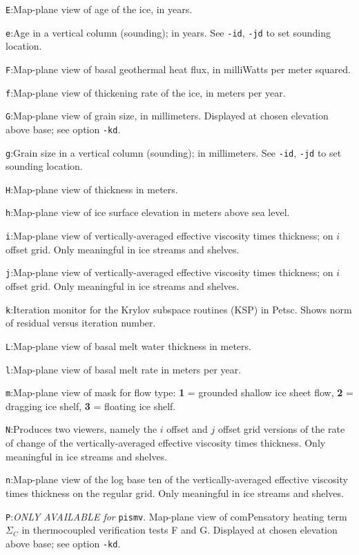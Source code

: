 \documentclass[11pt,final]{amsart}
\renewcommand{\t}[1]{\texttt{#1}}
\begin{document}
\verb|E|:\quad Map-plane view of age of the ice, in years.

\verb|e|:\quad Age in a vertical column (sounding); in years.  See \verb|-id|, \verb|-jd| to set sounding location.

\verb|F|:\quad Map-plane view of basal geothermal heat flux, in milliWatts per meter squared.

\verb|f|:\quad Map-plane view of thickening rate of the ice, in meters per year.

\verb|G|:\quad Map-plane view of grain size, in millimeters.  Displayed at chosen elevation above base; see option \verb|-kd|.

\verb|g|:\quad Grain size in a vertical column (sounding); in millimeters.  See \verb|-id|, \verb|-jd| to set sounding location.

\verb|H|:\quad Map-plane view of thickness in meters.

\verb|h|:\quad Map-plane view of ice surface elevation in meters above sea level.

\verb|i|:\quad Map-plane view of vertically-averaged effective viscosity times thickness; on $i$ offset grid.  Only meaningful in ice streams and shelves.

\verb|j|:\quad Map-plane view of vertically-averaged effective viscosity times thickness; on $i$ offset grid.  Only meaningful in ice streams and shelves.

\verb|k|:\quad Iteration monitor for the Krylov subspace routines (KSP) in Petsc.  Shows norm of residual versus iteration number.

\verb|L|:\quad Map-plane view of basal melt water thickness in meters.

\verb|l|:\quad Map-plane view of basal melt rate in meters per year.

\verb|m|:\quad Map-plane view of mask for flow type:  \textbf{1} = grounded shallow ice sheet flow,  \textbf{2} = dragging ice shelf, \textbf{3} = floating ice shelf.

\verb|N|:\quad Produces two viewers, namely the $i$ offset and $j$ offset grid versions of the rate of change of the vertically-averaged effective viscosity times thickness.  Only meaningful in ice streams and shelves.

\verb|n|:\quad Map-plane view of the log base ten of the vertically-averaged effective viscosity times thickness on the regular grid.  Only meaningful in ice streams and shelves.

\verb|P|:\quad \emph{ONLY AVAILABLE for }\t{pismv}.  Map-plane view of comPensatory heating term $\Sigma_C$ in thermocoupled verification tests F and G.  Displayed at chosen elevation above base; see option \verb|-kd|.
\end{document}
